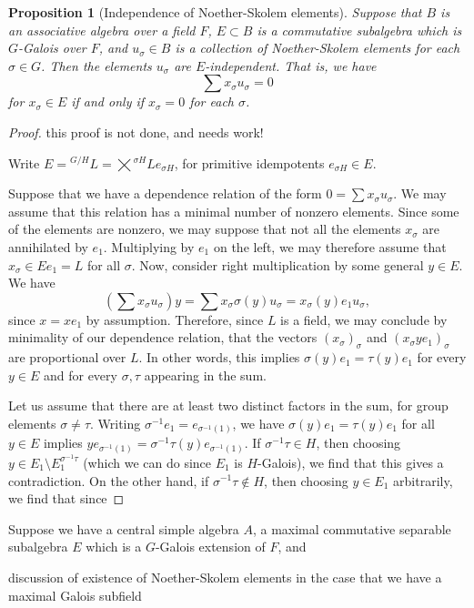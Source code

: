 \documentclass[12pt]{report}
\theoremstyle{plain}
\newtheorem{prop}[thm]{Proposition}
\newcommand{\todo}[1]{\textcolor{todo}{#1}}
\begin{document}
\begin{prop}[Independence of Noether-Skolem elements] \label{ns indep}
Suppose that $B$ is an associative algebra over a field $F$, $E \subset B$
is a commutative subalgebra which is $G$-Galois over $F$, and $u_\sigma \in
B$ is a collection of Noether-Skolem elements for each $\sigma \in G$. Then
the elements $u_\sigma$ are $E$-independent. That is, we have
\[\sum x_\sigma u_\sigma = 0\]
for $x_\sigma \in E$ if and only if $x_\sigma = 0$ for each $\sigma$.
\end{prop}
\begin{proof}
\todo{this proof is not done, and needs work!}

Write $E = {^{G/H}L} = \bigtimes {}^{\sigma H} L e_{\sigma H}$, for
primitive idempotents $e_{\sigma H} \in E$.

Suppose that we have a dependence relation of the form $0 = \sum x_\sigma
u_\sigma$. We may assume that this relation has a minimal number of nonzero
elements. Since some of the elements are nonzero, we may suppose that not all the elements
$x_\sigma$ are annihilated by $e_1$. Multiplying by $e_1$ on the left, we
may therefore assume that $x_\sigma \in E e_1 = L$ for all $\sigma$. Now,
consider right multiplication by some general $y \in E$. We have
\[\left(\sum x_\sigma u_\sigma\right) y = \sum x_\sigma \sigma(y) u_\sigma
= x_\sigma (y)e_1 u_\sigma, \]
since $x = x e_1$ by assumption. Therefore, since $L$ is a field, we may
conclude by minimality of our dependence relation, that the vectors
$(x_\sigma)_\sigma$ and $(x_\sigma ye_1)_\sigma$ are proportional over $L$. In
other words, this implies $\sigma(y)e_1 = \tau(y) e_1$ for every $y \in E$
and for every $\sigma, \tau$ appearing in the sum. 

Let us assume that there are at least two distinct factors in the sum, for
group elements $\sigma \neq \tau$. Writing $\sigma^{-1} e_1 =
e_{\sigma^{-1}(1)}$, we have $\sigma(y) e_1 = \tau(y) e_1$ for all $y \in
E$ implies $y e_{\sigma^{-1}(1)} = \sigma^{-1} \tau(y) e_{\sigma^{-1}(1)}$.
If $\sigma^{-1} \tau \in H$, then choosing $y \in E_1 \setminus
E_1^{\sigma^{-1} \tau}$ (which we can do since $E_1$ is $H$-Galois), we
find that this gives a contradiction. On the other hand, if
$\sigma^{-1}\tau \not\in H$, then choosing $y \in E_1$ arbitrarily, we find
that since 
\end{proof}
Suppose we have a central simple algebra $A$, a maximal commutative
separable subalgebra $E$ which is a $G$-Galois extension of $F$, and 

\todo{discussion of existence of Noether-Skolem elements in the case that
we have a maximal Galois subfield}
\end{document}
